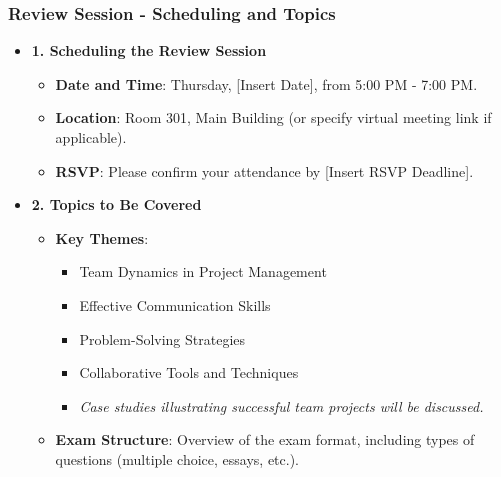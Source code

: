 \documentclass{beamer}
\begin{document}
\begin{frame}[fragile]
    \frametitle{Review Session - Scheduling and Topics}
    \begin{itemize}
        \item \textbf{1. Scheduling the Review Session}
        \begin{itemize}
            \item \textbf{Date and Time}: Thursday, [Insert Date], from 5:00 PM - 7:00 PM.
            \item \textbf{Location}: Room 301, Main Building (or specify virtual meeting link if applicable).
            \item \textbf{RSVP}: Please confirm your attendance by [Insert RSVP Deadline].
        \end{itemize}
        \item \textbf{2. Topics to Be Covered}
        \begin{itemize}
            \item \textbf{Key Themes}: 
            \begin{itemize}
                \item Team Dynamics in Project Management
                \item Effective Communication Skills
                \item Problem-Solving Strategies
                \item Collaborative Tools and Techniques
                \item \textit{Case studies illustrating successful team projects will be discussed.}
            \end{itemize}
            \item \textbf{Exam Structure}: Overview of the exam format, including types of questions (multiple choice, essays, etc.).
        \end{itemize}
    \end{itemize}
\end{frame}
\end{document}
